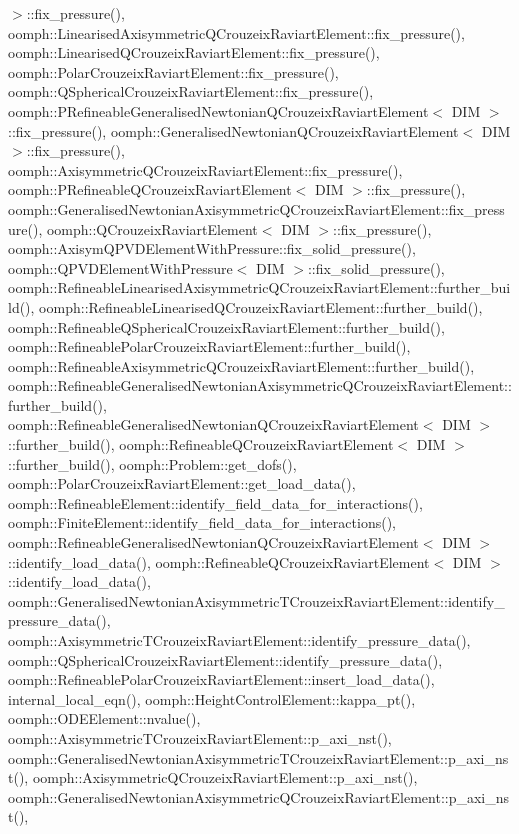 $>$\+::fix\+\_\+pressure(), oomph\+::\+Linearised\+Axisymmetric\+Q\+Crouzeix\+Raviart\+Element\+::fix\+\_\+pressure(), oomph\+::\+Linearised\+Q\+Crouzeix\+Raviart\+Element\+::fix\+\_\+pressure(), oomph\+::\+Polar\+Crouzeix\+Raviart\+Element\+::fix\+\_\+pressure(), oomph\+::\+Q\+Spherical\+Crouzeix\+Raviart\+Element\+::fix\+\_\+pressure(), oomph\+::\+P\+Refineable\+Generalised\+Newtonian\+Q\+Crouzeix\+Raviart\+Element$<$ D\+I\+M $>$\+::fix\+\_\+pressure(), oomph\+::\+Generalised\+Newtonian\+Q\+Crouzeix\+Raviart\+Element$<$ D\+I\+M $>$\+::fix\+\_\+pressure(), oomph\+::\+Axisymmetric\+Q\+Crouzeix\+Raviart\+Element\+::fix\+\_\+pressure(), oomph\+::\+P\+Refineable\+Q\+Crouzeix\+Raviart\+Element$<$ D\+I\+M $>$\+::fix\+\_\+pressure(), oomph\+::\+Generalised\+Newtonian\+Axisymmetric\+Q\+Crouzeix\+Raviart\+Element\+::fix\+\_\+pressure(), oomph\+::\+Q\+Crouzeix\+Raviart\+Element$<$ D\+I\+M $>$\+::fix\+\_\+pressure(), oomph\+::\+Axisym\+Q\+P\+V\+D\+Element\+With\+Pressure\+::fix\+\_\+solid\+\_\+pressure(), oomph\+::\+Q\+P\+V\+D\+Element\+With\+Pressure$<$ D\+I\+M $>$\+::fix\+\_\+solid\+\_\+pressure(), oomph\+::\+Refineable\+Linearised\+Axisymmetric\+Q\+Crouzeix\+Raviart\+Element\+::further\+\_\+build(), oomph\+::\+Refineable\+Linearised\+Q\+Crouzeix\+Raviart\+Element\+::further\+\_\+build(), oomph\+::\+Refineable\+Q\+Spherical\+Crouzeix\+Raviart\+Element\+::further\+\_\+build(), oomph\+::\+Refineable\+Polar\+Crouzeix\+Raviart\+Element\+::further\+\_\+build(), oomph\+::\+Refineable\+Axisymmetric\+Q\+Crouzeix\+Raviart\+Element\+::further\+\_\+build(), oomph\+::\+Refineable\+Generalised\+Newtonian\+Axisymmetric\+Q\+Crouzeix\+Raviart\+Element\+::further\+\_\+build(), oomph\+::\+Refineable\+Generalised\+Newtonian\+Q\+Crouzeix\+Raviart\+Element$<$ D\+I\+M $>$\+::further\+\_\+build(), oomph\+::\+Refineable\+Q\+Crouzeix\+Raviart\+Element$<$ D\+I\+M $>$\+::further\+\_\+build(), oomph\+::\+Problem\+::get\+\_\+dofs(), oomph\+::\+Polar\+Crouzeix\+Raviart\+Element\+::get\+\_\+load\+\_\+data(), oomph\+::\+Refineable\+Element\+::identify\+\_\+field\+\_\+data\+\_\+for\+\_\+interactions(), oomph\+::\+Finite\+Element\+::identify\+\_\+field\+\_\+data\+\_\+for\+\_\+interactions(), oomph\+::\+Refineable\+Generalised\+Newtonian\+Q\+Crouzeix\+Raviart\+Element$<$ D\+I\+M $>$\+::identify\+\_\+load\+\_\+data(), oomph\+::\+Refineable\+Q\+Crouzeix\+Raviart\+Element$<$ D\+I\+M $>$\+::identify\+\_\+load\+\_\+data(), oomph\+::\+Generalised\+Newtonian\+Axisymmetric\+T\+Crouzeix\+Raviart\+Element\+::identify\+\_\+pressure\+\_\+data(), oomph\+::\+Axisymmetric\+T\+Crouzeix\+Raviart\+Element\+::identify\+\_\+pressure\+\_\+data(), oomph\+::\+Q\+Spherical\+Crouzeix\+Raviart\+Element\+::identify\+\_\+pressure\+\_\+data(), oomph\+::\+Refineable\+Polar\+Crouzeix\+Raviart\+Element\+::insert\+\_\+load\+\_\+data(), internal\+\_\+local\+\_\+eqn(), oomph\+::\+Height\+Control\+Element\+::kappa\+\_\+pt(), oomph\+::\+O\+D\+E\+Element\+::nvalue(), oomph\+::\+Axisymmetric\+T\+Crouzeix\+Raviart\+Element\+::p\+\_\+axi\+\_\+nst(), oomph\+::\+Generalised\+Newtonian\+Axisymmetric\+T\+Crouzeix\+Raviart\+Element\+::p\+\_\+axi\+\_\+nst(), oomph\+::\+Axisymmetric\+Q\+Crouzeix\+Raviart\+Element\+::p\+\_\+axi\+\_\+nst(), oomph\+::\+Generalised\+Newtonian\+Axisymmetric\+Q\+Crouzeix\+Raviart\+Element\+::p\+\_\+axi\+\_\+nst(), 